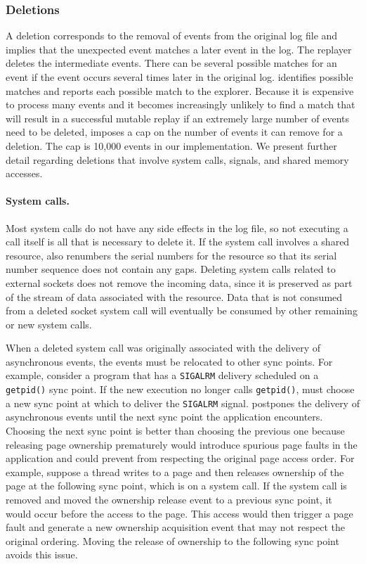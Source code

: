 \subsubsection{Deletions}
A deletion corresponds to the removal of events from the original log
file and implies that the unexpected event matches a later event in the
log. The replayer deletes the intermediate events.  There can be
several possible matches for an event if the event occurs several
times later in the original log.  {\dora} identifies
possible matches and reports each possible match to the explorer. Because it is
expensive to process many events and it becomes increasingly unlikely
to find a match that will result in a successful mutable replay if an
extremely large number of events need to be deleted, {\dora}
imposes a cap on the number of events it can remove for a deletion.
The cap is 10,000 events in our implementation.  We present
further detail regarding deletions that involve system calls,
signals, and shared memory accesses.

\paragraph{System calls.}
Most system calls do not have any side
effects in the log file, so not executing a call itself is all that is
necessary to delete it. If the system call involves a shared resource, {\dora}
also renumbers the serial numbers for the resource so that its serial
number sequence does not contain any gaps. Deleting system
calls related to external sockets does not remove the incoming data, since it is
preserved as part of the stream of data associated with the resource.
Data that is not consumed from a deleted socket system call
will eventually be consumed by other remaining or new system calls.

When a deleted system call was originally associated with the
delivery of asynchronous events, the events must be relocated to other
sync points.  For example, consider a program that has a {\tt SIGALRM}
delivery scheduled on a {\tt getpid()} sync point.  If the new
execution no longer calls {\tt getpid()}, {\dora} must choose a new
sync point at which to deliver the {\tt SIGALRM} signal.  {\dora}
postpones the delivery of asynchronous events until the next sync
point the application encounters.
Choosing the next sync point is better than choosing the
previous one because releasing page ownership prematurely would
introduce spurious page faults in the application and could prevent
{\dora} from respecting the original page access order.  For
example, suppose a thread writes to a page and then releases ownership
of the page at the following sync point, which is on a system call. If
the system call is removed and {\dora} moved the ownership release
event to a previous sync point, it would occur before the access to
the page. This access would then trigger a page fault and generate a
new ownership acquisition event that may not respect the
original ordering.  Moving the release of ownership to the following
sync point avoids this issue.

